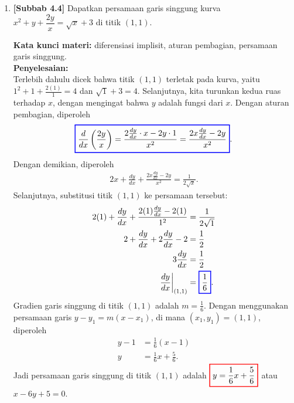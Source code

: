 \documentclass[10pt,openany,a4paper]{article}
\theoremstyle{definition}
\theoremstyle{definition}
\theoremstyle{plain}
\newenvironment{jawab}[2][tes]{%
\par\noindent\textbf{Kata kunci materi:} #1.\\
\textbf{Penyelesaian:} #2%
}{}
\begin{document}
\begin{enumerate}
    \item \textbf{[Subbab 4.4]} Dapatkan persamaan garis singgung kurva $x^2+y+\dfrac{2y}{x}=\sqrt{x}+3$ di titik $(1,1)$.
    \begin{jawab}[diferensiasi implisit, aturan pembagian, persamaan garis singgung]{~\\
        Terlebih dahulu dicek bahwa titik $(1,1)$ terletak pada kurva, yaitu $1^2+1+\frac{2(1)}{1}=4$ dan $\sqrt{1}+3=4$. Selanjutnya, kita turunkan kedua ruas terhadap $x$, dengan mengingat bahwa $y$ adalah fungsi dari $x$. Dengan aturan pembagian, diperoleh
        \begin{align*}
            \colorlet{oldcolor}{.}
        \color{blue}
        \setlength{\fboxrule}{1pt} \boxed{\color{oldcolor}\frac{d}{dx}\left(\frac{2y}{x}\right) = \frac{2\frac{dy}{dx}\cdot x - 2y\cdot 1}{x^2} = \frac{2x\frac{dy}{dx} - 2y}{x^2}}\color{oldcolor}.
        \end{align*}
        Dengan demikian, diperoleh
        \begin{align*}
            2x + \frac{dy}{dx} + \frac{2x\frac{dy}{dx} - 2y}{x^2} = \frac{1}{2\sqrt{x}}.
        \end{align*}
        Selanjutnya, substitusi titik $(1,1)$ ke persamaan tersebut:
        \begin{align*}
            2(1) + \frac{dy}{dx} + \frac{2(1)\frac{dy}{dx} - 2(1)}{1^2} &= \frac{1}{2\sqrt{1}}\\
            2 + \frac{dy}{dx} + 2\frac{dy}{dx} - 2 &= \frac{1}{2}\\
            3\frac{dy}{dx} &= \frac{1}{2}\\
            \frac{dy}{dx}\bigg|_{(1,1)} &= \colorlet{oldcolor}{.}
        \color{blue}
        \setlength{\fboxrule}{1pt} \boxed{\color{oldcolor}\frac{1}{6}}\color{oldcolor}.
        \end{align*}
        Gradien garis singgung di titik $(1,1)$ adalah $m=\frac{1}{6}$. Dengan menggunakan persamaan garis $y - y_1 = m(x - x_1)$, di mana $(x_1,y_1)=(1,1)$, diperoleh
        \begin{align*}
            y - 1 &= \frac{1}{6}(x - 1)\\
            y &= \frac{1}{6}x + \frac{5}{6}.
        \end{align*}
        Jadi persamaan garis singgung di titik $(1,1)$ adalah $\colorlet{oldcolor}{.}
        \color{red}
        \setlength{\fboxrule}{1pt} \boxed{\color{oldcolor}y = \frac{1}{6}x + \frac{5}{6}}\color{oldcolor}$ atau $x-6y+5=0$.
    }
    \end{jawab}
\end{enumerate}
\end{document}
